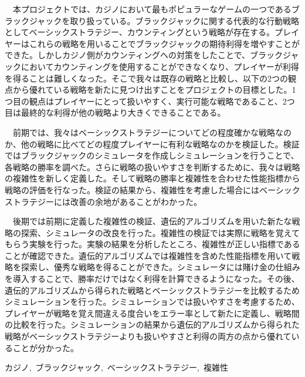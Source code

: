 \documentclass[11pt,a4paper,oneside]{jsbook}
\begin{document}
\maketitle
{}
\fontsize{10}{18}\selectfont
\frontmatter

\begin{jabstract} 
\ \ 本プロジェクトでは、カジノにおいて最もポピュラーなゲームの一つであるブラックジャックを取り扱っている。ブラックジャックに関する代表的な行動戦略としてベーシックストラテジー、カウンティングという戦略が存在する。プレイヤーはこれらの戦略を用いることでブラックジャックの期待利得を増やすことができた。しかしカジノ側がカウンティングへの対策をしたことで、ブラックジャックにおいてカウンティングを使用することができなくなり、プレイヤーが利得を得ることは難しくなった。そこで我々は既存の戦略と比較し、以下の2つの観点から優れている戦略を新たに見つけ出すことをプロジェクトの目標とした。1つ目の観点はプレイヤーにとって扱いやすく、実行可能な戦略であること、2つ目は最終的な利得が他の戦略より大きくできることである。

\ \ 前期では、我々はベーシックストラテジーについてどの程度確かな戦略なのか、他の戦略に比べてどの程度プレイヤーに有利な戦略なのかを検証した。検証ではブラックジャックのシミュレータを作成しシミュレーションを行うことで、各戦略の勝率を調べた。さらに戦略の扱いやすさを判断するために、我々は戦略の複雑性を新しく定義した。そして戦略の勝率と複雑性を合わせた性能指標から戦略の評価を行なった。検証の結果から、複雑性を考慮した場合にはベーシックストラテジーには改善の余地があることがわかった。

\ \ 後期では前期に定義した複雑性の検証、遺伝的アルゴリズムを用いた新たな戦略の探索、シミュレータの改良を行った。複雑性の検証では実際に戦略を覚えてもらう実験を行った。実験の結果を分析したところ、複雑性が正しい指標であることが確認できた。遺伝的アルゴリズムでは複雑性を含めた性能指標を用いて戦略を探索し、優秀な戦略を得ることができた。シミュレータには賭け金の仕組みを導入することで、勝率だけではなく利得を計算できるようになった。その後、遺伝的アルゴリズムから得られた戦略とベーシックストラテジーを比較するためシミュレーションを行った。シミュレーションでは扱いやすさを考慮するため、プレイヤーが戦略を覚え間違える度合いをエラー率として新たに定義し、戦略間の比較を行った。シミュレーションの結果から遺伝的アルゴリズムから得られた戦略がベーシックストラテジーよりも扱いやすさと利得の両方の点から優れていることが分かった。

\begin{jkeyword}
カジノ,\ ブラックジャック,\ ベーシックストラテジー,\ 複雑性
\end{jkeyword}
\end{jabstract}
\end{document}
